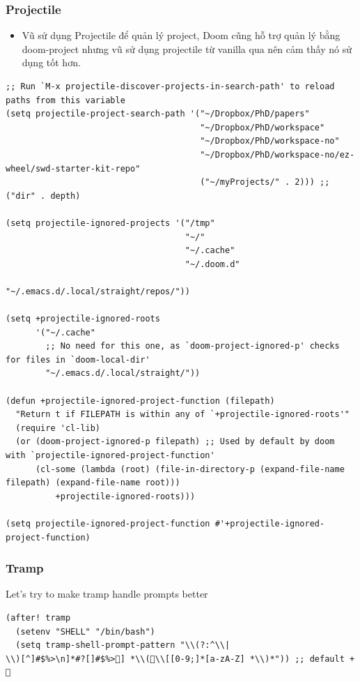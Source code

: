 \documentclass[11pt]{article}
\begin{document}
\subsubsection{Projectile}
\label{sec:org86cbc21}
\begin{itemize}
\item Vũ sử dụng Projectile để quản lý project, Doom cũng hỗ trợ quản lý bằng
doom-project nhưng vũ sử dụng projectile từ vanilla qua nên cảm thấy nó sử
dụng tốt hơn.
\end{itemize}

\begin{verbatim}
;; Run `M-x projectile-discover-projects-in-search-path' to reload paths from this variable
(setq projectile-project-search-path '("~/Dropbox/PhD/papers"
                                       "~/Dropbox/PhD/workspace"
                                       "~/Dropbox/PhD/workspace-no"
                                       "~/Dropbox/PhD/workspace-no/ez-wheel/swd-starter-kit-repo"
                                       ("~/myProjects/" . 2))) ;; ("dir" . depth)

(setq projectile-ignored-projects '("/tmp"
                                    "~/"
                                    "~/.cache"
                                    "~/.doom.d"
                                    "~/.emacs.d/.local/straight/repos/"))

(setq +projectile-ignored-roots
      '("~/.cache"
        ;; No need for this one, as `doom-project-ignored-p' checks for files in `doom-local-dir'
        "~/.emacs.d/.local/straight/"))

(defun +projectile-ignored-project-function (filepath)
  "Return t if FILEPATH is within any of `+projectile-ignored-roots'"
  (require 'cl-lib)
  (or (doom-project-ignored-p filepath) ;; Used by default by doom with `projectile-ignored-project-function'
      (cl-some (lambda (root) (file-in-directory-p (expand-file-name filepath) (expand-file-name root)))
          +projectile-ignored-roots)))

(setq projectile-ignored-project-function #'+projectile-ignored-project-function)
\end{verbatim}

\subsubsection{Tramp}
\label{sec:orgfd53eff}
Let's try to make tramp handle prompts better

\begin{verbatim}
(after! tramp
  (setenv "SHELL" "/bin/bash")
  (setq tramp-shell-prompt-pattern "\\(?:^\\|
\\)[^]#$%>\n]*#?[]#$%>] *\\(\\[[0-9;]*[a-zA-Z] *\\)*")) ;; default + 
\end{verbatim}
\end{document}
